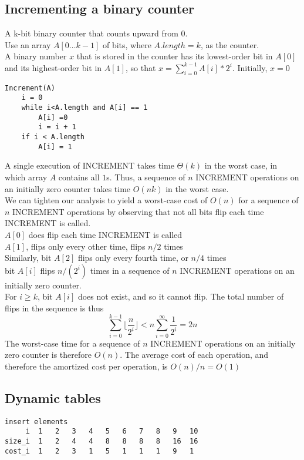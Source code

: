 \documentclass{article}
\begin{document}
\subsection{Incrementing a binary counter}
A k-bit binary counter that counts upward from $0$.\\
Use an array $A[0…k-1]$ of bits, where $A.length = k$, as the counter.\\
A binary number $x$ that is stored in the counter has its lowest-order bit in $A[0]$ and its highest-order bit in $A[1]$, so that $x=\sum_{i=0}^{k-1} A[i]*2^i$. Initially, $x = 0$
\begin{verbatim}
Increment(A)
    i = 0
    while i<A.length and A[i] == 1
        A[i] =0
        i = i + 1
    if i < A.length
        A[i] = 1
\end{verbatim}

A single execution of INCREMENT takes time $\Theta(k)$ in the worst case, in which array $A$ contains all $1$s. Thus, a sequence of $n$ INCREMENT operations on an initially zero counter takes time $O(nk)$ in the worst case.\\
We can tighten our analysis to yield a worst-case cost of $O(n)$ for a sequence of $n$ INCREMENT operations by observing that not all bits flip each time INCREMENT is called.\\
$A[0]$ does flip each time INCREMENT is called\\
$A[1]$, flips only every other time, flips $n/2$ times\\
Similarly, bit $A[2]$ flips only every fourth time, or $n/4$ times\\
bit $A[i]$ flips $n/(2^i)$ times in a sequence of $n$ INCREMENT operations on an initially zero counter.\\
For $i \geq k$, bit $A[i]$ does not exist, and so it cannot flip. The total number of flips in the sequence is thus
$$
\sum_{i=0}^{k-1}\lfloor \frac{n}{2^i} \rfloor
< n \sum_{i=0}^{\infty} \frac{1}{2^i}
= 2n
$$
The worst-case time for a sequence of $n$ INCREMENT operations on an initially zero counter is therefore $O(n)$. The average cost of each operation, and therefore the amortized cost per operation, is $O(n)/n = O(1)$
\subsection{Dynamic tables}
\begin{verbatim}
insert elements
     i	1	2	3	4	5	6	7	8	9 	10
size_i	1	2	4	4	8	8	8	8	16	16
cost_i	1	2	3	1	5	1	1	1	9 	1
\end{verbatim}
\end{document}
